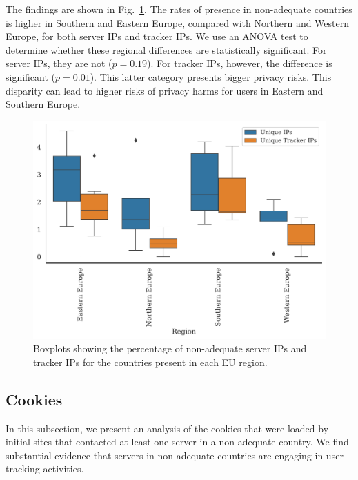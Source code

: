 The findings are shown in Fig.~\ref{fig:regional}. The rates
of presence in non-adequate countries is higher in Southern and Eastern 
Europe, compared with Northern and Western Europe, for both server IPs and tracker IPs. 
We use an ANOVA test to determine whether these regional differences are statistically significant.
For server IPs, they are not ($p=0.19$). For tracker IPs, however, the difference is significant ($p=0.01$).
This latter category presents bigger privacy risks.
This disparity can lead to higher risks of privacy harms for users in Eastern and Southern Europe.

\begin{figure}
    \centering
    \includegraphics[width=\linewidth]{figures/boxplot.pdf}
    \caption{Boxplots showing the percentage of non-adequate server IPs and tracker IPs for the countries 
present in each EU region.}
\label{fig:regional}
\end{figure}

\subsection{Cookies}
In this subsection, we present an analysis of the cookies that were
loaded by initial sites that contacted at least one server in a non-adequate country.
We find substantial evidence that servers in non-adequate countries 
are engaging in user tracking activities.

